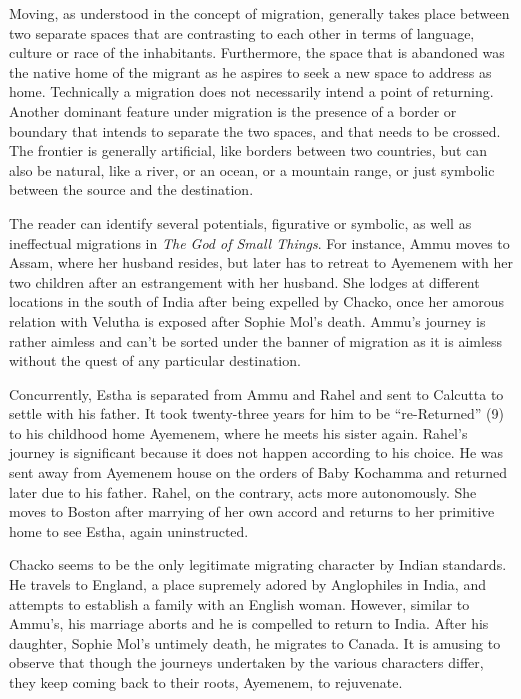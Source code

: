 Moving, as understood in the concept of migration, generally takes place between two separate spaces that are contrasting to each other in terms of language, culture or race of the inhabitants. Furthermore, the space that is abandoned was the native home of the migrant as he aspires to seek a new space to address as home. Technically a migration does not necessarily intend a point of returning. Another dominant feature under migration is the presence of a border or boundary that intends to separate the two spaces, and that needs to be crossed. The frontier is generally artificial, like borders between two countries, but can also be natural, like a river, or an ocean, or a mountain range, or just symbolic between the source and the destination. 

The reader can identify several potentials, figurative or symbolic, as well as ineffectual migrations in \emph{The God of Small Things}. For instance, Ammu moves to Assam, where her husband resides, but later has to retreat to Ayemenem with her two children after an estrangement with her husband. She lodges at different locations in the south of India after being expelled by Chacko, once her amorous relation with Velutha is exposed after Sophie Mol’s death. Ammu’s journey is rather aimless and can’t be sorted under the banner of migration as it is aimless without the quest of any particular destination. 

Concurrently, Estha is separated from Ammu and Rahel and sent to Calcutta to settle with his father. It took twenty-three years for him to be “re-Returned” (9) to his childhood home Ayemenem, where he meets his sister again. Rahel’s journey is significant because it does not happen according to his choice. He was sent away from Ayemenem house on the orders of Baby Kochamma and returned later due to his father. Rahel, on the contrary, acts more autonomously. She moves to Boston after marrying of her own accord and returns to her primitive home to see Estha, again uninstructed. 

Chacko seems to be the only legitimate migrating character by Indian standards. He travels to England, a place supremely adored by Anglophiles in India, and attempts to establish a family with an English woman. However, similar to Ammu’s, his marriage aborts and he is compelled to return to India. After his daughter, Sophie Mol’s untimely death, he migrates to Canada. It is amusing to observe that though the journeys undertaken by the various characters differ, they keep coming back to their roots, Ayemenem, to rejuvenate.

